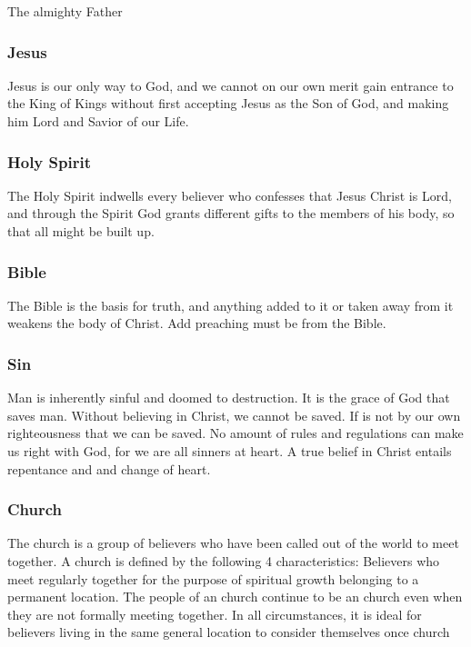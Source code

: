 The almighty Father



\subsubsection{Jesus}

Jesus is our only way to God, and we cannot on our own merit gain entrance to the King of Kings without first accepting Jesus as the Son of God, and making him Lord and Savior of our Life.



\subsubsection{Holy Spirit}

The Holy Spirit indwells every believer who confesses that Jesus Christ is Lord, and through the Spirit God grants different gifts to the members of his body, so that all might be built up.



\subsubsection{Bible}

The Bible is the basis for truth, and anything added to it or taken away from it weakens the body of Christ. Add preaching must be from the Bible.



\subsubsection{Sin}

Man is inherently sinful and doomed to destruction. It is the grace of God that saves man. Without believing in Christ, we cannot be saved. If is not by our own righteousness that we can be saved. No amount of rules and regulations can make us right with God, for we are all sinners at heart. A true belief in Christ entails repentance and and change of heart.


\subsubsection{Church}

The church is a group of believers who have been called out of the world to meet together. A church is defined by the following 4 characteristics: Believers who meet regularly together for the purpose of spiritual growth belonging to a permanent location. The people of an church continue to be an church even when they are not formally meeting together. In all circumstances, it is ideal for believers living in the same general location to consider themselves once church

